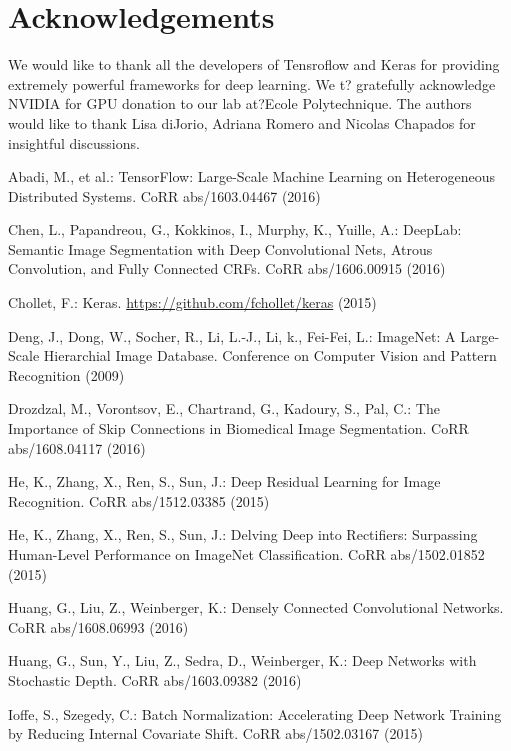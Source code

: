 \documentclass{llncs}
\begin{document}
\section*{Acknowledgements}
We would like to thank all the developers of Tensroflow and Keras for providing extremely powerful  frameworks for deep learning.  We  t? gratefully  acknowledge  NVIDIA  for  GPU  donation to  our  lab  at?Ecole  Polytechnique.  The  authors  would  like  to  thank  Lisa  diJorio,  Adriana  Romero  and  Nicolas  Chapados  for  insightful  discussions.  


\begin{thebibliography}{23}

Abadi, M., et al.:
TensorFlow: Large-Scale Machine Learning on Heterogeneous Distributed Systems.
CoRR abs/1603.04467 (2016)

Chen, L., Papandreou, G., Kokkinos, I., Murphy, K., Yuille, A.:
DeepLab: Semantic Image Segmentation with Deep Convolutional Nets, Atrous Convolution, and Fully Connected CRFs.
CoRR abs/1606.00915 (2016)

Chollet, F.:
Keras.
\url{https://github.com/fchollet/keras} (2015)

Deng, J., Dong, W., Socher, R., Li, L.-J., Li, k., Fei-Fei, L.:
ImageNet: A Large-Scale Hierarchial Image Database.
Conference on Computer Vision and Pattern Recognition (2009)

Drozdzal, M., Vorontsov, E., Chartrand, G., Kadoury, S., Pal, C.:
The Importance of Skip Connections in Biomedical Image Segmentation.
CoRR abs/1608.04117 (2016)

He, K., Zhang, X., Ren, S., Sun, J.:
Deep Residual Learning for Image Recognition.
CoRR abs/1512.03385 (2015)

He, K., Zhang, X., Ren, S., Sun, J.:
Delving Deep into Rectifiers: Surpassing Human-Level Performance on ImageNet Classification.
CoRR abs/1502.01852 (2015)

Huang, G., Liu, Z., Weinberger, K.:
Densely Connected Convolutional Networks.
CoRR abs/1608.06993 (2016)

Huang, G., Sun, Y., Liu, Z., Sedra, D., Weinberger, K.:
Deep Networks with Stochastic Depth.
CoRR abs/1603.09382 (2016)

Ioffe, S., Szegedy, C.:
Batch Normalization: Accelerating Deep Network Training by Reducing Internal Covariate Shift.
CoRR abs/1502.03167 (2015)


\end{thebibliography}
\end{document}
